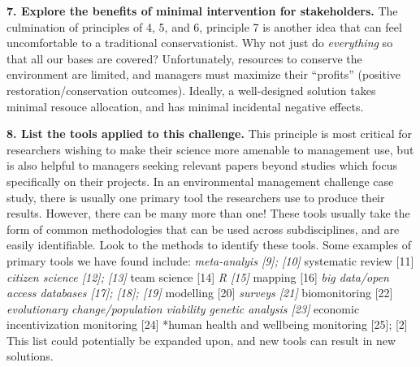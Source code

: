 \documentclass[10pt,letterpaper]{article}
\begin{document}
\textbf{7. Explore the benefits of minimal intervention for
stakeholders.} The culmination of principles of 4, 5, and 6, principle 7
is another idea that can feel uncomfortable to a traditional
conservationist. Why not just do \emph{everything} so that all our bases
are covered? Unfortunately, resources to conserve the environment are
limited, and managers must maximize their ``profits'' (positive
restoration/conservation outcomes). Ideally, a well-designed solution
takes minimal resouce allocation, and has minimal incidental negative
effects.

\textbf{8. List the tools applied to this challenge.} This principle is
most critical for researchers wishing to make their science more
amenable to management use, but is also helpful to managers seeking
relevant papers beyond studies which focus specifically on their
projects. In an environmental management challenge case study, there is
usually one primary tool the researchers use to produce their results.
However, there can be many more than one! These tools usually take the
form of common methodologies that can be used across subdisciplines, and
are easily identifiable. Look to the methods to identify these tools.
Some examples of primary tools we have found include: \emph{meta-analyis
{[}9{]}; {[}10{]} }systematic review {[}11{]} \emph{citizen science
{[}12{]}; {[}13{]} }team science {[}14{]} \emph{R {[}15{]} }mapping
{[}16{]} \emph{big data/open access databases {[}17{]}; {[}18{]};
{[}19{]} }modelling {[}20{]} \emph{surveys {[}21{]} }biomonitoring
{[}22{]} \emph{evolutionary change/population viability genetic analysis
{[}23{]} }economic incentivization monitoring {[}24{]} *human health and
wellbeing monitoring {[}25{]}; {[}2{]} This list could potentially be
expanded upon, and new tools can result in new solutions.
\end{document}

